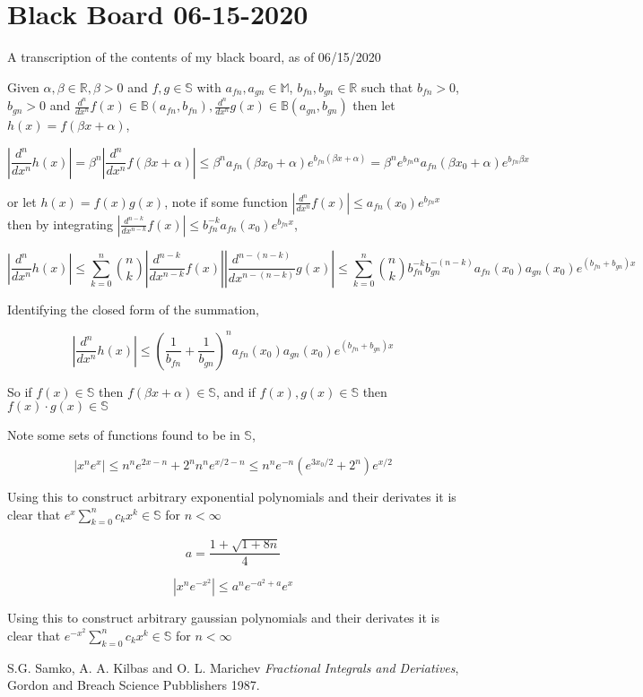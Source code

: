 \documentclass[%
 preprint,
 amsmath, amssymb, aps, pra, 10pt
]{revtex4-2}
\begin{document}
\section{Black Board 06-15-2020}

A transcription of the contents of my black board, as of 06/15/2020

Given $\alpha, \beta \in \mathbb{R}, \beta > 0$ and $f, g \in \mathbb{S}$ with $a_{fn}, a_{gn} \in \mathbb{M}$, $ b_{fn}, b_{gn} \in \mathbb{R}$ such that $b_{fn} > 0$, $b_{gn} > 0$ and $\frac{d^n}{dx^n} f(x) \in \mathbb{B}(a_{fn}, b_{fn}), \frac{d^n}{dx^n} g(x) \in \mathbb{B}(a_{gn}, b_{gn})$ then let $h(x) = f(\beta x + \alpha)$,

\[\left| \frac{d^n}{dx^n}h(x) \right| = \beta^n \left| \frac{d^n}{dx^n}f(\beta x + \alpha) \right| \leq \beta^n a_{fn}(\beta x_0 + \alpha)e^{b_{fn}(\beta x + \alpha)} = \beta^n e^{b_{fn}\alpha} a_{fn}(\beta x_0 + \alpha)e^{b_{fn}\beta x}\]

or let $h(x) = f(x)g(x)$, note if some function $\left| \frac{d^n}{dx^n}f(x) \right| \leq a_{fn}(x_0)e^{b_{fn}x}$ then by integrating $\left| \frac{d^{n-k}}{dx^{n-k}}f(x) \right| \leq b_{fn}^{-k}a_{fn}(x_0)e^{b_{fn}x}$,

\[\left| \frac{d^n}{dx^n}h(x) \right| \leq \sum_{k=0}^n \binom{n}{k}\left| \frac{d^{n-k}}{dx^{n-k}}f(x) \right|\left| \frac{d^{n-(n-k)}}{dx^{n-(n-k)}}g(x) \right| \leq \sum_{k = 0}^n \binom{n}{k}b_{fn}^{-k}b_{gn}^{-(n-k)}a_{fn}(x_0)a_{gn}(x_0)e^{(b_{fn} + b_{gn})x} \]

Identifying the closed form of the summation,

\[\left| \frac{d^n}{dx^n}h(x) \right| \leq \left(\frac{1}{b_{fn}} + \frac{1}{b_{gn}} \right)^n a_{fn}(x_0)a_{gn}(x_0) e^{(b_{fn} + b_{gn})x}\]

So if $f(x) \in \mathbb{S}$ then $f(\beta x + \alpha) \in \mathbb{S}$, and if $f(x), g(x) \in \mathbb{S}$ then $f(x)\cdot g(x) \in \mathbb{S}$

Note some sets of functions found to be in $\mathbb{S}$,

\[\left| x^ne^x \right| \leq n^n e^{2x - n} + 2^n n^n e^{x/2 - n} \leq n^n e^{-n}\left(e^{3x_0/2} + 2^n\right)e^{x/2}\]

Using this to construct arbitrary exponential polynomials and their derivates it is clear that $e^x\sum_{k=0}^n c_k x^k \in \mathbb{S}$ for $n<\infty$

\[a = \frac{1 + \sqrt{1 + 8n}}{4}\]

\[\left|x^n e^{-x^2}\right| \leq a^n e^{-a^2+a}e^x\]

Using this to construct arbitrary gaussian polynomials and their derivates it is clear that $e^{-x^2}\sum_{k=0}^n c_k x^k \in \mathbb{S}$ for $n<\infty$

\begin{thebibliography}{1}

  S.G. Samko, A. A. Kilbas and O. L. Marichev
  \textit{Fractional Integrals and Deriatives},
  Gordon and Breach Science Pubblishers
  1987.

\end{thebibliography}
\end{document}
